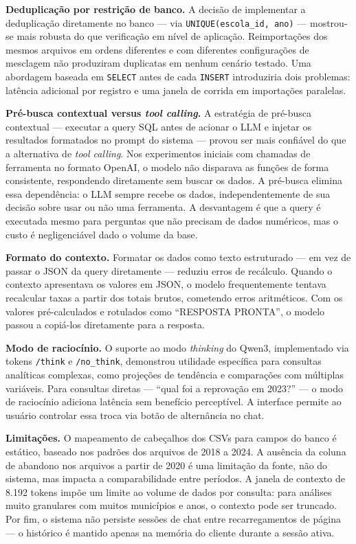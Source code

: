 \documentclass[preprint,10pt,5p]{elsarticle}
\begin{document}
\textbf{Deduplicação por restrição de banco.} A decisão de implementar a deduplicação
diretamente no banco — via \texttt{UNIQUE(escola\_id, ano)} — mostrou-se mais robusta do
que verificação em nível de aplicação. Reimportações dos mesmos arquivos em ordens
diferentes e com diferentes configurações de mesclagem não produziram duplicatas em nenhum
cenário testado. Uma abordagem baseada em \texttt{SELECT} antes de cada \texttt{INSERT}
introduziria dois problemas: latência adicional por registro e uma janela de corrida em
importações paralelas.

\textbf{Pré-busca contextual versus \textit{tool calling}.} A estratégia de pré-busca
contextual — executar a query SQL antes de acionar o LLM e injetar os resultados formatados
no prompt do sistema — provou ser mais confiável do que a alternativa de \textit{tool
calling}. Nos experimentos iniciais com chamadas de ferramenta no formato OpenAI, o modelo
não disparava as funções de forma consistente, respondendo diretamente sem buscar os dados.
A pré-busca elimina essa dependência: o LLM sempre recebe os dados, independentemente de
sua decisão sobre usar ou não uma ferramenta. A desvantagem é que a query é executada mesmo
para perguntas que não precisam de dados numéricos, mas o custo é negligenciável dado o
volume da base.

\textbf{Formato do contexto.} Formatar os dados como texto estruturado — em vez de passar
o JSON da query diretamente — reduziu erros de recálculo. Quando o contexto apresentava os
valores em JSON, o modelo frequentemente tentava recalcular taxas a partir dos totais
brutos, cometendo erros aritméticos. Com os valores pré-calculados e rotulados como
``RESPOSTA PRONTA'', o modelo passou a copiá-los diretamente para a resposta.

\textbf{Modo de raciocínio.} O suporte ao modo \textit{thinking} do Qwen3, implementado
via tokens \texttt{/think} e \texttt{/no\_think}, demonstrou utilidade específica para
consultas analíticas complexas, como projeções de tendência e comparações com múltiplas
variáveis. Para consultas diretas — ``qual foi a reprovação em 2023?'' — o modo de
raciocínio adiciona latência sem benefício perceptível. A interface permite ao usuário
controlar essa troca via botão de alternância no chat.

\textbf{Limitações.} O mapeamento de cabeçalhos dos CSVs para campos do banco é estático,
baseado nos padrões dos arquivos de 2018 a 2024. A ausência da coluna de abandono nos
arquivos a partir de 2020 é uma limitação da fonte, não do sistema, mas impacta a
comparabilidade entre períodos. A janela de contexto de 8.192 tokens impõe um limite ao
volume de dados por consulta: para análises muito granulares com muitos municípios e anos,
o contexto pode ser truncado. Por fim, o sistema não persiste sessões de chat entre
recarregamentos de página — o histórico é mantido apenas na memória do cliente durante a
sessão ativa.
\end{document}
